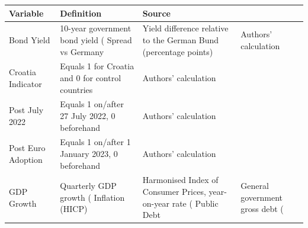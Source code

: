 \begin{tabular}{lp{9cm}l}
\hline
Variable & Definition & Source \\
\hline
Bond Yield & 10-year government bond yield (%
Spread vs Germany & Yield difference relative to the German Bund (percentage points) & Authors' calculation \\
Croatia Indicator & Equals 1 for Croatia and 0 for control countries & Authors' calculation \\
Post July 2022 & Equals 1 on/after 27 July 2022, 0 beforehand & Authors' calculation \\
Post Euro Adoption & Equals 1 on/after 1 January 2023, 0 beforehand & Authors' calculation \\
GDP Growth & Quarterly GDP growth (%
Inflation (HICP) & Harmonised Index of Consumer Prices, year-on-year rate (%
Public Debt & General government gross debt (%
\hline
\end{tabular}

